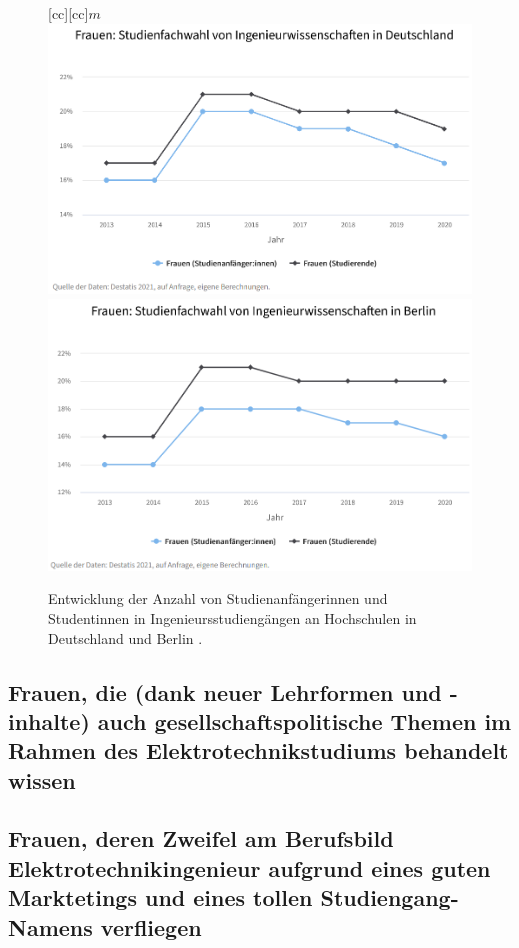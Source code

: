 \documentclass[a4paper, 12 pt]{IEEEtran}
\begin{document}
\begin{figure}[!ht]
	\centering
{}[cc][cc]{$m$}
	\includegraphics[width=0.95\columnwidth]{DataLabMINT_Frauen Ing 2013 bis 2020.png}
    \includegraphics[width=0.95\columnwidth]{DataLabMINT_Frauen Ing 2013 bis 2020_Berlin.png}
	\caption{Entwicklung der Anzahl von Studienanfängerinnen und Studentinnen in Ingenieursstudiengängen an Hochschulen in Deutschland und Berlin \cite{MINTvernetzt.17.01.2023}.}
	\label{fig:DataMINT}
\end{figure}

\subsection{Frauen, die (dank neuer Lehrformen und -inhalte) auch gesellschaftspolitische Themen im Rahmen des Elektrotechnikstudiums behandelt wissen}

\subsection{Frauen, deren Zweifel am Berufsbild Elektrotechnikingenieur aufgrund eines guten Marktetings und eines tollen Studiengang- Namens verfliegen}
\end{document}

